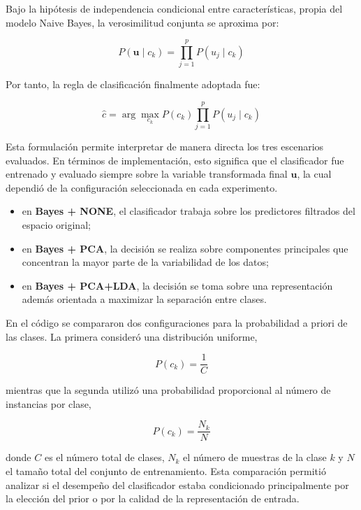 \documentclass[11pt, a4paper]{article}
\begin{document}
Bajo la hipótesis de independencia condicional entre características, propia del modelo Naive Bayes, la verosimilitud conjunta se aproxima por:

\begin{equation}
P(\mathbf{u} \mid c_k) = \prod_{j=1}^{p} P(u_j \mid c_k)
\end{equation}

Por tanto, la regla de clasificación finalmente adoptada fue:

\begin{equation}
\hat{c} = \arg\max_{c_k} P(c_k)\prod_{j=1}^{p} P(u_j \mid c_k)
\end{equation}

Esta formulación permite interpretar de manera directa los tres escenarios evaluados. En términos de implementación, esto significa que el clasificador fue entrenado y evaluado siempre sobre la variable transformada final $\mathbf{u}$, la cual dependió de la configuración seleccionada en cada experimento.

\begin{itemize}
    \item en \textbf{Bayes + NONE}, el clasificador trabaja sobre los predictores filtrados del espacio original;
    \item en \textbf{Bayes + PCA}, la decisión se realiza sobre componentes principales que concentran la mayor parte de la variabilidad de los datos;
    \item en \textbf{Bayes + PCA+LDA}, la decisión se toma sobre una representación además orientada a maximizar la separación entre clases.
\end{itemize}

En el código se compararon dos configuraciones para la probabilidad a priori de las clases. La primera consideró una distribución uniforme,

\begin{equation}
P(c_k) = \frac{1}{C}
\end{equation}

mientras que la segunda utilizó una probabilidad proporcional al número de instancias por clase,

\begin{equation}
P(c_k) = \frac{N_k}{N}
\end{equation}

donde $C$ es el número total de clases, $N_k$ el número de muestras de la clase $k$ y $N$ el tamaño total del conjunto de entrenamiento. Esta comparación permitió analizar si el desempeño del clasificador estaba condicionado principalmente por la elección del prior o por la calidad de la representación de entrada.
\end{document}
